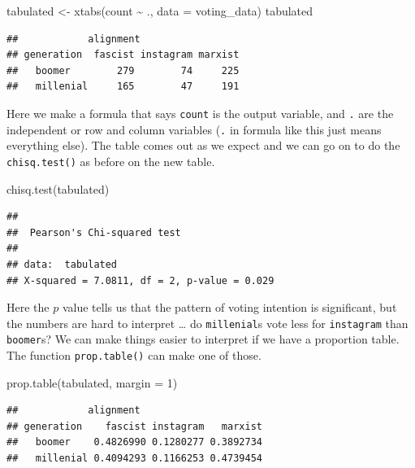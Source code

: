\documentclass[
]{book}
\newenvironment{Shaded}{\begin{snugshade}}{\end{snugshade}}
\newcommand{\AttributeTok}[1]{\textcolor[rgb]{0.77,0.63,0.00}{#1}}
\newcommand{\DecValTok}[1]{\textcolor[rgb]{0.00,0.00,0.81}{#1}}
\newcommand{\FunctionTok}[1]{\textcolor[rgb]{0.00,0.00,0.00}{#1}}
\newcommand{\NormalTok}[1]{#1}
\newcommand{\OtherTok}[1]{\textcolor[rgb]{0.56,0.35,0.01}{#1}}
\newcommand{\SpecialCharTok}[1]{\textcolor[rgb]{0.00,0.00,0.00}{#1}}
\begin{document}
\begin{Shaded}
\begin{Highlighting}[]
\NormalTok{tabulated }\OtherTok{\textless{}{-}} \FunctionTok{xtabs}\NormalTok{(count }\SpecialCharTok{\textasciitilde{}}\NormalTok{ ., }\AttributeTok{data =}\NormalTok{ voting\_data)}
\NormalTok{tabulated}
\end{Highlighting}
\end{Shaded}

\begin{verbatim}
##            alignment
## generation  fascist instagram marxist
##   boomer        279        74     225
##   millenial     165        47     191
\end{verbatim}

Here we make a formula that says \texttt{count} is the output variable, and \texttt{.} are the independent or row and column variables (\texttt{.} in formula like this just means everything else). The table comes out as we expect and we can go on to do the \texttt{chisq.test()} as before on the new table.

\begin{Shaded}
\begin{Highlighting}[]
\FunctionTok{chisq.test}\NormalTok{(tabulated)}
\end{Highlighting}
\end{Shaded}

\begin{verbatim}
## 
## 	Pearson's Chi-squared test
## 
## data:  tabulated
## X-squared = 7.0811, df = 2, p-value = 0.029
\end{verbatim}

Here the \(p\) value tells us that the pattern of voting intention is significant, but the numbers are hard to interpret \ldots{} do \texttt{millenial}s vote less for \texttt{instagram} than \texttt{boomer}s? We can make things easier to interpret if we have a proportion table. The function \texttt{prop.table()} can make one of those.

\begin{Shaded}
\begin{Highlighting}[]
\FunctionTok{prop.table}\NormalTok{(tabulated, }\AttributeTok{margin =} \DecValTok{1}\NormalTok{)}
\end{Highlighting}
\end{Shaded}

\begin{verbatim}
##            alignment
## generation    fascist instagram   marxist
##   boomer    0.4826990 0.1280277 0.3892734
##   millenial 0.4094293 0.1166253 0.4739454
\end{verbatim}
\end{document}
